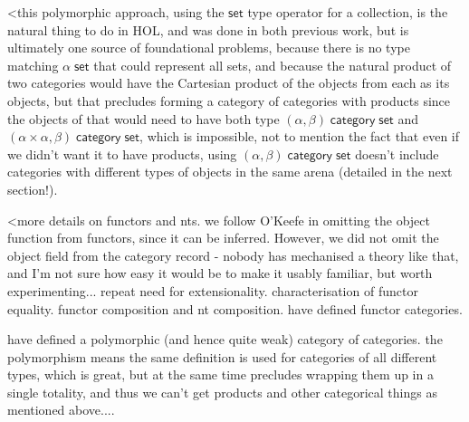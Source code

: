 \documentclass[twoside,titlepage,11pt]{article}
\begin{document}
<this polymorphic approach, using the $\mathsf{set}$ type operator for a collection, is the natural thing to do in HOL, and was done in both previous work, but is ultimately one source of foundational problems, because there is no type matching $\alpha\;\mathsf{set}$ that could represent all sets, and because the natural product of two categories would have the Cartesian product of the objects from each as its objects, but that precludes forming a category of categories with products since the objects of that would need to have both type $(\alpha,\beta)\;\mathsf{category}\;\mathsf{set}$ and $(\alpha\times\alpha,\beta)\;\mathsf{category}\;\mathsf{set}$, which is impossible, not to mention the fact that even if we didn't want it to have products, using $(\alpha,\beta)\;\mathsf{category}\;\mathsf{set}$ doesn't include categories with different types of objects in the same arena (detailed in the next section!). 

<more details on functors and nts. we follow O'Keefe in omitting the object function from functors, since it can be inferred. However, we did not omit the object field from the category record - nobody has mechanised a theory like that, and I'm not sure how easy it would be to make it usably familiar, but worth experimenting...
repeat need for extensionality. characterisation of functor equality. functor composition and nt composition. have defined functor categories.

have defined a polymorphic (and hence quite weak) category of categories. the polymorphism means the same definition is used for categories of all different types, which is great, but at the same time precludes wrapping them up in a single totality, and thus we can't get products and other categorical things as mentioned above....
\end{document}
